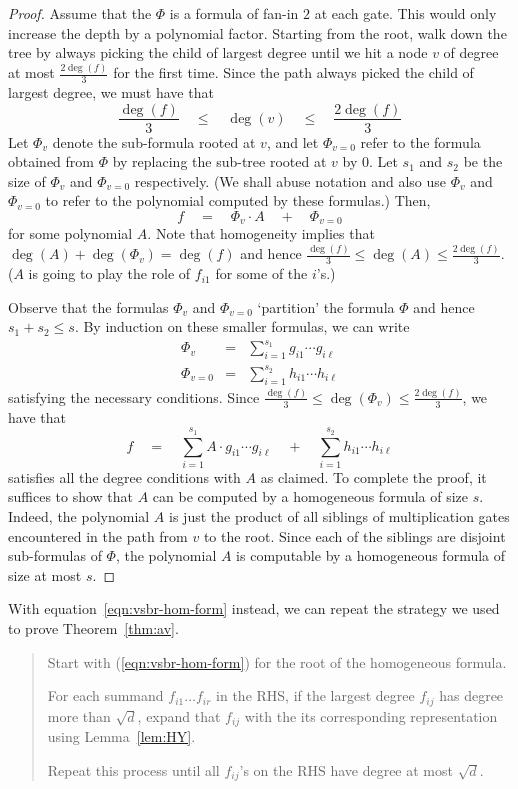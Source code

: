 \documentclass{beatcs}
\newcommand{\spaced}[1]{\quad#1\quad}
\begin{document}
\begin{proof}
Assume that the $\Phi$ is a formula of fan-in $2$ at each gate. This would only increase the depth by a polynomial factor. Starting from the root, walk down the tree by always picking the child of largest degree until we hit a node $v$ of degree at most $\frac{2\deg(f)}{3}$ for the first time. Since the path always picked the child of largest degree, we must have that 
\[
\frac{\deg(f)}{3}\spaced{\leq}\deg(v)\spaced{\leq} \frac{2\deg(f)}{3}
\]
Let $\Phi_v$ denote the sub-formula rooted at $v$, and let $\Phi_{v=0}$ refer to the formula obtained from $\Phi$ by replacing the sub-tree rooted at $v$ by $0$. Let $s_1$ and $s_2$ be the size of $\Phi_v$ and $\Phi_{v=0}$ respectively. (We shall abuse notation and also use $\Phi_v$ and $\Phi_{v=0}$ to refer to the polynomial computed by these formulas.) Then,
\[
f \spaced{=} \Phi_v \cdot A \spaced{+} \Phi_{v=0}
\] 
for some polynomial $A$. Note that homogeneity implies that $\deg(A) + \deg(\Phi_v) = \deg(f)$ and hence $\frac{\deg(f)}{3} \leq \deg(A) \leq \frac{2\deg(f)}{3}$. ($A$ is going to play the role of $f_{i1}$ for some of the $i$'s.)

Observe that the formulas $\Phi_v$ and $\Phi_{v=0}$ `partition' the formula $\Phi$ and hence $s_1 + s_2 \leq s$. By induction on these smaller formulas, we can write
\begin{eqnarray*}
\Phi_v & = & \sum_{i=1}^{s_1} g_{i1} \cdots g_{i\ell}\\
\Phi_{v=0} & = & \sum_{i=1}^{s_2} h_{i1} \cdots h_{i\ell}
\end{eqnarray*}
satisfying the necessary conditions. Since $\frac{\deg(f)}{3} \leq \deg(\Phi_v)\leq \frac{2\deg(f)}{3}$, we have that
\[
f \spaced{=} \sum_{i=1}^{s_1} A \cdot g_{i1} \cdots g_{i\ell} \spaced{+} \sum_{i=1}^{s_2} h_{i1} \cdots h_{i\ell}
\]
satisfies all the degree conditions with $A$ as claimed. To complete the proof, it suffices to show that $A$ can be computed by a homogeneous formula of size $s$. Indeed, the polynomial $A$ is just the product of all siblings of multiplication gates encountered in the path from $v$ to the root. Since each of the siblings are disjoint sub-formulas of $\Phi$, the polynomial $A$ is computable by a homogeneous formula of size at most $s$. 
\end{proof}

With equation~\eqref{eqn:vsbr-hom-form} instead, we can repeat the strategy we used to prove Theorem~\ref{thm:av}. 
\begin{mdframed}
\begin{quote}
Start with (\ref{eqn:vsbr-hom-form}) for the root of the homogeneous formula. 

For each summand $f_{i1}\dots f_{ir}$ in the RHS, if the largest degree $f_{ij}$ has degree more than $\sqrt{d}$, expand that $f_{ij}$ with the its corresponding representation using Lemma~\ref{lem:HY}. 

Repeat this process until all $f_{ij}$'s on the RHS have degree at most $\sqrt{d}$. 
\end{quote}
\end{mdframed}
\end{document}
